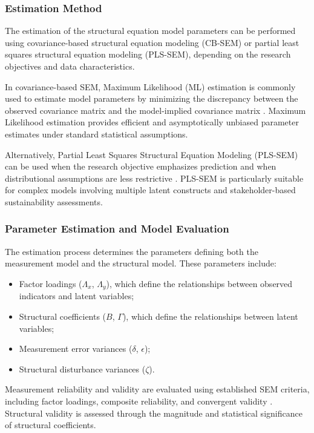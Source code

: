 \documentclass[11pt,a4paper]{article}
\begin{document}
\subsubsection{Estimation Method}

The estimation of the structural equation model parameters can be performed using covariance-based structural equation modeling (CB-SEM) or partial least squares structural equation modeling (PLS-SEM), depending on the research objectives and data characteristics.

In covariance-based SEM, Maximum Likelihood (ML) estimation is commonly used to estimate model parameters by minimizing the discrepancy between the observed covariance matrix and the model-implied covariance matrix \cite{Kline2016,Byrne2016}. Maximum Likelihood estimation provides efficient and asymptotically unbiased parameter estimates under standard statistical assumptions.

Alternatively, Partial Least Squares Structural Equation Modeling (PLS-SEM) can be used when the research objective emphasizes prediction and when distributional assumptions are less restrictive \cite{Hair2022}. PLS-SEM is particularly suitable for complex models involving multiple latent constructs and stakeholder-based sustainability assessments.

\subsubsection{Parameter Estimation and Model Evaluation}

The estimation process determines the parameters defining both the measurement model and the structural model. These parameters include:

\begin{itemize}
\item Factor loadings ($\Lambda_x$, $\Lambda_y$), which define the relationships between observed indicators and latent variables;
\item Structural coefficients ($B$, $\Gamma$), which define the relationships between latent variables;
\item Measurement error variances ($\delta$, $\epsilon$);
\item Structural disturbance variances ($\zeta$).
\end{itemize}

Measurement reliability and validity are evaluated using established SEM criteria, including factor loadings, composite reliability, and convergent validity \cite{Fornell1981,Hair2022}. Structural validity is assessed through the magnitude and statistical significance of structural coefficients.
\end{document}
